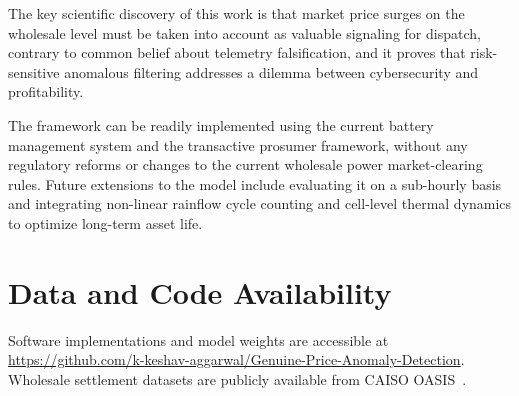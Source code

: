 \documentclass[journal]{IEEEtran}
\begin{document}
The key scientific discovery of this work is that market price surges on the wholesale level must be taken into account as valuable signaling for dispatch, contrary to common belief about telemetry falsification, and it proves that risk-sensitive anomalous filtering addresses a dilemma between cybersecurity and profitability.

The framework can be readily implemented using the current battery management system and the transactive prosumer framework, without any regulatory reforms or changes to the current wholesale power market-clearing rules.
Future extensions to the model include evaluating it on a sub-hourly basis and integrating non-linear rainflow cycle counting and cell-level thermal dynamics to optimize long-term asset life.

\section*{Data and Code Availability}
Software implementations and model weights are accessible at \url{https://github.com/k-keshav-aggarwal/Genuine-Price-Anomaly-Detection}. Wholesale settlement datasets are publicly available from CAISO OASIS~\cite{CAISO}.



\end{document}
